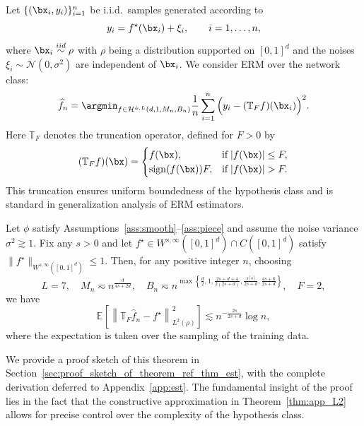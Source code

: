 \documentclass[11pt]{article}
\begin{document}
Let $\{(\bx_i,y_i)\}_{i=1}^n$ be i.i.d.\ samples generated according to
\begin{equation}
\label{eq:data_nonparametric}
y_i = f^\star(\bx_i) + \xi_i, 
\qquad i=1,\dots,n,
\end{equation}
where  $\bx_i \stackrel{iid}{\sim} \rho$ with $\rho$ being a distribution  supported on $[0,1]^d$ 
and the noises $\xi_i \sim \mathcal{N}(0,\sigma^2)$ are independent of $\bx_i$. We consider ERM over the network class:
\begin{equation} 
    \widehat{f}_n = \argmin_{f \in \mathcal{H}^{\phi,L}(d, 1,M_n,B_n)} \frac{1}{n} \sum_{i=1}^n \Big( y_i -(\mathbb{T}_F f)(\bx_i)\Big)^2.
    \label{eq:ERM}
\end{equation}
Here $\mathbb{T}_{F}$ denotes the truncation operator, defined for $F>0$ by
\begin{equation*}
    (\mathbb{T}_{F} f)(\bx) = \begin{cases}
        f(\bx), &\text{if} \;|f(\bx)| \leq F,\\
        \operatorname{sign}(f(\bx)) F, & \text{if}\; |f(\bx)|>F.
    \end{cases}
\end{equation*}
This truncation ensures uniform boundedness of the hypothesis class and is standard in generalization  analysis of ERM estimators.


\begin{theorem}
\label{thm:sample-com}
 Let $\phi$ satisfy Assumptions~\ref{ass:smooth}--\ref{ass:piece} and assume the noise variance $\sigma^2\gtrsim 1$. Fix any $s>0$ and let $f^\star \in W^{s,\infty}([0,1]^d)\cap C([0,1]^d)$ satisfy $\|f^\star\|_{W^{s,\infty}([0,1]^d)}\le 1$. Then, for any positive integer $n$, choosing
    \begin{equation}
        L= 7, \quad M_n \eqsim  n^{\frac{d}{4s+2d}} , \quad  B_n \eqsim n^{\max \left\{ \frac{d}{2}, 1, \frac{2s+d+4}{2(2s+d)}, \frac{s \lceil s\rceil}{2s+d},\frac{4s+6}{2s+d} \right\}} , \quad F = 2,
        \label{eq:est_LMBF}
    \end{equation}
    we have
    \begin{equation}
        \mathbb{E}_{} \left[ \left\| \mathbb{T}_{F} \widehat{f}_n - f^\star\right\|_{L^2(\rho)}^2  
        \right] \lesssim  n^{-\frac{2s}{2s + d}} \log n,
        \label{eq: gen_rate_upper}
    \end{equation}
     where  the expectation is taken over the sampling of the training data.
     \label{thm:est}
\end{theorem}
We provide a proof sketch of this theorem in Section~\ref{sec:proof_sketch_of_theorem_ref_thm_est}, with the complete derivation deferred to Appendix~\ref{app:est}. The fundamental insight of the proof lies in the fact that the constructive approximation in Theorem~\ref{thm:app_L2} allows for precise control over the complexity of the hypothesis class. 
\end{document}

